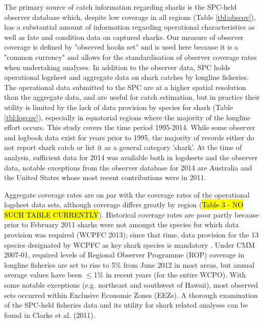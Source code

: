 \documentclass[12pt]{SCreport}
\begin{document}
The primary source of catch information regarding sharks is the SPC-held observer database which, despite low coverage in all regions (Table \ref{tbl:obscov}), has a substantial amount of information regarding operational characteristics as well as fate and condition data on captured sharks. Our measure of observer coverage is defined by "observed hooks set" and is used here because it is a "common currency" and allows for the standardisation of observer coverage rates when undertaking analyses.  In addition to the observer data, SPC holds operational logsheet and aggregate data on shark catches by longline fisheries. The operational data submitted to the SPC are at a higher spatial resolution than the aggregate data, and are useful for catch estimation, but in practice their utility is limited by the lack of data provision by species for shark (Table \ref{tbl:logcov}), especially in equatorial regions where the majority of the longline effort occurs. This study covers the time period 1995-2014. While some observer and logbook data exist for years prior to 1995, the majority of records either do not report shark catch or list it as a general category 'shark'.  At the time of analysis, sufficient data for 2014 was available both in logsheets and the observer data, notable exceptions from the observer database for 2014 are Australia and the United States whose most recent contributions were in 2011.

Aggregate coverage rates are on par with the coverage rates of the operational logsheet data sets, although coverage differs greatly by region (\hl{Table 3 - NO SUCH TABLE CURRENTLY}). Historical coverage rates are poor partly because prior to February 2011 sharks were not amongst the species for which data provision was required (WCPFC 2013); since that time, data provision for the 13 species designated by WCPFC as key shark species is mandatory . Under CMM 2007-01, required levels of Regional Observer Programme (ROP) coverage in longline fisheries are set to rise to 5\% from June 2012 in most areas, but annual average values have been $\leq$1\% in recent years (for the entire WCPO). With some notable exceptions (e.g. northeast and southwest of Hawaii), most observed sets occurred within Exclusive Economic Zones (EEZs). A thorough examination of the SPC-held fisheries data and its utility for shark related analyses can be found in Clarke et al. (2011).
\end{document}
